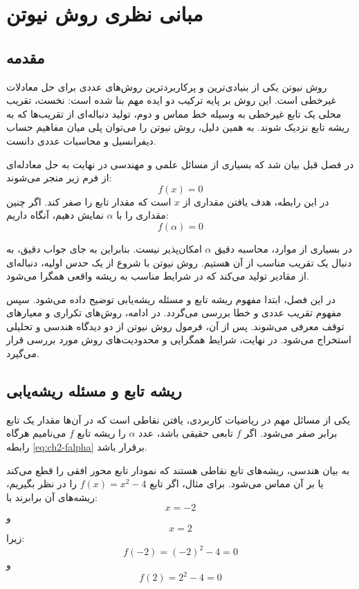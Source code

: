 \chapter{مبانی نظری روش نیوتن}\label{ch:theory}

\section{مقدمه}

روش نیوتن یکی از بنیادی‌ترین و پرکاربردترین روش‌های عددی برای حل معادلات غیرخطی است. این روش بر پایه ترکیب دو ایده مهم بنا شده است: نخست، تقریب محلی یک تابع غیرخطی به وسیله خط مماس و دوم، تولید دنباله‌ای از تقریب‌ها که به ریشه تابع نزدیک شوند. به همین دلیل، روش نیوتن را می‌توان پلی میان مفاهیم حساب دیفرانسیل و محاسبات عددی دانست.

در فصل قبل بیان شد که بسیاری از مسائل علمی و مهندسی در نهایت به حل معادله‌ای از فرم زیر منجر می‌شوند:
\begin{equation}
f(x)=0
\label{eq:ch2-fzero}
\end{equation}
در این رابطه، هدف یافتن مقداری از $x$ است که مقدار تابع را صفر کند. اگر چنین مقداری را با $\alpha$ نمایش دهیم، آنگاه داریم:
\begin{equation}
f(\alpha)=0
\label{eq:ch2-falpha}
\end{equation}

در بسیاری از موارد، محاسبه دقیق $\alpha$ امکان‌پذیر نیست. بنابراین به جای جواب دقیق، به دنبال یک تقریب مناسب از آن هستیم. روش نیوتن با شروع از یک حدس اولیه، دنباله‌ای از مقادیر تولید می‌کند که در شرایط مناسب به ریشه واقعی همگرا می‌شود.

در این فصل، ابتدا مفهوم ریشه تابع و مسئله ریشه‌یابی توضیح داده می‌شود. سپس مفهوم تقریب عددی و خطا بررسی می‌گردد. در ادامه، روش‌های تکراری و معیارهای توقف معرفی می‌شوند. پس از آن، فرمول روش نیوتن از دو دیدگاه هندسی و تحلیلی استخراج می‌شود. در نهایت، شرایط همگرایی و محدودیت‌های روش مورد بررسی قرار می‌گیرد.

\section{ریشه تابع و مسئله ریشه‌یابی}
\label{sec:root}

یکی از مسائل مهم در ریاضیات کاربردی، یافتن نقاطی است که در آن‌ها مقدار یک تابع برابر صفر می‌شود. اگر $f$ تابعی حقیقی باشد، عدد $\alpha$ را ریشه تابع $f$ می‌نامیم هرگاه رابطه \eqref{eq:ch2-falpha} برقرار باشد.

به بیان هندسی، ریشه‌های تابع نقاطی هستند که نمودار تابع محور افقی را قطع می‌کند یا بر آن مماس می‌شود. برای مثال، اگر تابع $f(x)=x^2-4$ را در نظر بگیریم، ریشه‌های آن برابرند با:
\[
x=-2
\]
و
\[
x=2
\]
زیرا:
\[
f(-2)=(-2)^2-4=0
\]
و
\[
f(2)=2^2-4=0
\]

